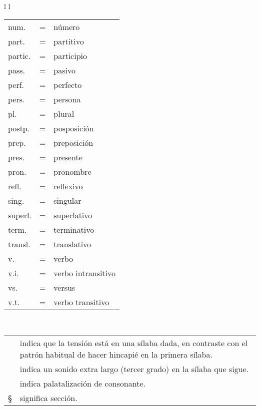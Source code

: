 \begin{tabular}{ l l }
\begin{tabular}{ l c l }
	num.	& = & número \\
	part.	& = & partitivo \\
	partic.	& = & participio \\
	pass.	& = & pasivo \\
	perf.	& = & perfecto \\
	pers.	& = & persona \\
	pl.		& = & plural \\
	postp.	& = & posposición \\
	prep.	& = & preposición \\
	pres.	& = & presente \\
	pron.	& = & pronombre \\
	refl.	& = & reflexivo \\
	sing.	& = & singular \\
	superl.	& = & superlativo \\
	term.	& = & terminativo \\
	transl.	& = & translativo \\
	v.		& = & verbo \\
	v.i.	& = & verbo intransitivo \\
	vs.		& = & versus \\
	v.t.	& = & verbo transitivo
	\end{tabular}
\end{tabular}\\ \bigskip

\begin{tabular}{ l p{10cm} }
	\textasciiacute & indica que la tensión está en una sílaba dada, en contraste con el patrón habitual de hacer hincapié en la primera sílaba. \\
	\textasciigrave & indica un sonido extra largo (tercer grado) en la sílaba que sigue. \\
	\textquotesingle & indica palatalización de consonante. \\
	\S & significa sección.
\end{tabular}		

\vfill
